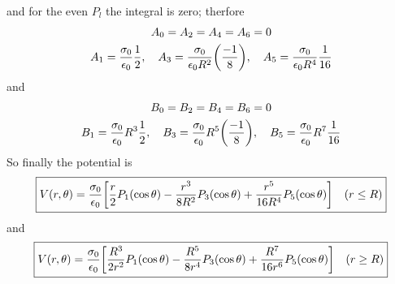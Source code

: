 \documentclass[../main.tex]{subfiles}
\begin{document}
and for the even $P_l$ the integral is zero; therfore
\begin{gather*}
    A_0 = A_2 = A_4 = A_6 = 0 \\
    A_1 = \frac{\sigma_0}{\epsilon_0} \frac{1}{2}, \quad A_3 = \frac{\sigma_0}{\epsilon_0 R^2} \qt(\frac{-1}{8}), \quad A_5 = \frac{\sigma_0}{\epsilon_0 R^4} \frac{1}{16}
\end{gather*}
and 
\begin{gather*}
    B_0 = B_2 = B_4 = B_6 = 0 \\
    B_1 = \frac{\sigma_0}{\epsilon_0} R^3 \frac{1}{2}, \quad B_3 = \frac{\sigma_0}{\epsilon_0} R^5 \qt(\frac{-1}{8}), \quad B_5 = \frac{\sigma_0}{\epsilon_0} R^7 \frac{1}{16}
\end{gather*}
So finally the potential is
\begin{align*}
    \boxed{
        V(r, \theta) = \frac{\sigma_0}{\epsilon_0} \qt[
            \frac{r}{2} P_1(\cos\theta) - \frac{r^3}{8R^2} P_3(\cos\theta) + \frac{r^5}{16R^4} P_5(\cos\theta)
        ] \quad (r \leq R)
    }
\end{align*}
and 
\begin{align*}
    \boxed{
        V(r, \theta) = \frac{\sigma_0}{\epsilon_0} \qt[
            \frac{R^3}{2r^2} P_1(\cos\theta) - \frac{R^5}{8r^4} P_3(\cos\theta) + \frac{R^7}{16r^6} P_5(\cos\theta)
        ] \quad (r \geq R)
    }
\end{align*}

\newpage
\end{document}
